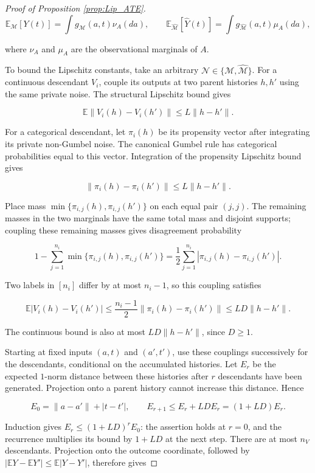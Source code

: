 \begin{proof}[Proof of Proposition \ref{prop:Lip_ATE}]
\[
\mathbb{E}_{\mathcal{M}}[Y(t)]=\int g_{\mathcal{M}}(a,t)\nu_A(da),\qquad
\mathbb{E}_{\hat{\mathcal{M}}}[\hat{Y}(t)]=\int g_{\hat{\mathcal{M}}}(a,t)\mu_A(da),
\]

where $\nu_A$ and $\mu_A$ are the observational marginals of $A$. 

To bound the Lipschitz constants, take an arbitrary $\mathcal{N}\in\{\mathcal{M},\hat{\mathcal{M}}\}$. For a continuous descendant $V_i$, couple its outputs at two parent histories $h,h'$ using the same private noise. The structural Lipschitz bound gives

\[
\mathbb{E}\|V_i(h)-V_i(h')\|\leqslant L\|h-h'\|.
\]

For a categorical descendant, let $\pi_i(h)$ be its propensity vector after integrating its private non-Gumbel noise. The canonical Gumbel rule has categorical probabilities equal to this vector. Integration of the propensity Lipschitz bound gives

\[
\|\pi_i(h)-\pi_i(h')\|\leqslant L\|h-h'\|.
\]

Place mass $\min\{\pi_{i,j}(h),\pi_{i,j}(h')\}$ on each equal pair $(j,j)$. The remaining masses in the two marginals have the same total mass and disjoint supports; coupling these remaining masses gives disagreement probability

\[
1-\sum_{j=1}^{n_i}\min\{\pi_{i,j}(h),\pi_{i,j}(h')\}
=\frac12\sum_{j=1}^{n_i}|\pi_{i,j}(h)-\pi_{i,j}(h')|.
\]

Two labels in $[n_i]$ differ by at most $n_i-1$, so this coupling satisfies

\[
\mathbb{E}|V_i(h)-V_i(h')|\leqslant\frac{n_i-1}{2}\|\pi_i(h)-\pi_i(h')\|\leqslant LD\|h-h'\|.
\]

The continuous bound is also at most $LD\|h-h'\|$, since $D\geqslant1$. 

Starting at fixed inputs $(a,t)$ and $(a',t')$, use these couplings successively for the descendants, conditional on the accumulated histories. Let $E_r$ be the expected $1$-norm distance between these histories after $r$ descendants have been generated. Projection onto a parent history cannot increase this distance. Hence

\[
E_0=\|a-a'\|+|t-t'|,\qquad E_{r+1}\leqslant E_r+LD E_r=(1+LD)E_r.
\]

Induction gives $E_r\leqslant(1+LD)^rE_0$: the assertion holds at $r=0$, and the recurrence multiplies its bound by $1+LD$ at the next step. There are at most $n_V$ descendants. Projection onto the outcome coordinate, followed by $|\mathbb{E}Y-\mathbb{E}Y'|\leqslant\mathbb{E}|Y-Y'|$, therefore gives


\end{proof}
